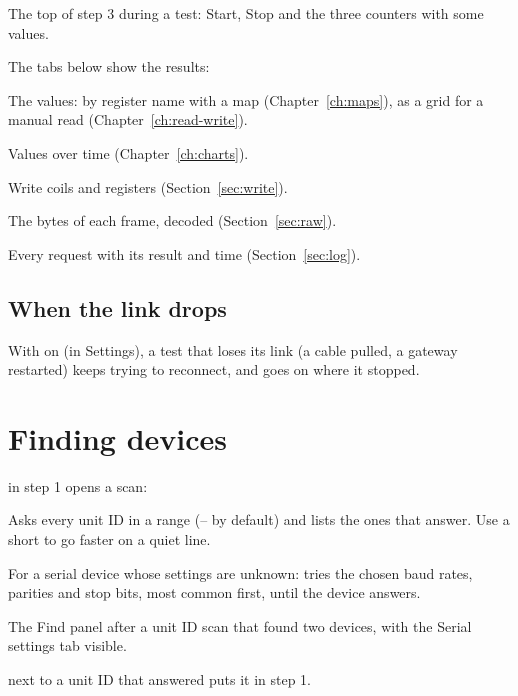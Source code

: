   {The top of step 3 during a test: Start, Stop and the three counters with
   some values.}

The tabs below show the results:

\begin{description}[style=nextline, leftmargin=0pt, font=\intermedium]
  \item[\tab{Device map} or \tab{Read registers}] The values: by register name
    with a map (Chapter~\ref{ch:maps}), as a grid for a manual read
    (Chapter~\ref{ch:read-write}).
  \item[\tab{Chart}] Values over time (Chapter~\ref{ch:charts}).
  \item[\tab{Write values}] Write coils and registers
    (Section~\ref{sec:write}).
  \item[\tab{Raw data}] The bytes of each frame, decoded
    (Section~\ref{sec:raw}).
  \item[\tab{Log}] Every request with its result and time
    (Section~\ref{sec:log}).
\end{description}

\subsection{When the link drops}

With  on (in Settings), a test that
loses its link (a cable pulled, a gateway restarted) keeps trying to
reconnect, and goes on where it stopped.

\section{Finding devices}
\label{sec:find-devices}

 in step 1 opens a scan:

\begin{description}[style=nextline, leftmargin=0pt, font=\intermedium]
  \item[\tab{Unit IDs}] Asks every unit ID in a range (-- by
    default) and lists the ones that answer. Use a short  to
    go faster on a quiet line.
  \item[\tab{Serial settings}] For a serial device whose settings are
    unknown: tries the chosen baud rates, parities and stop bits, most common
    first, until the device answers.
\end{description}

  {The Find panel after a unit ID scan that found two devices, with the
   Serial settings tab visible.}

 next to a unit ID that answered puts it in step 1.
